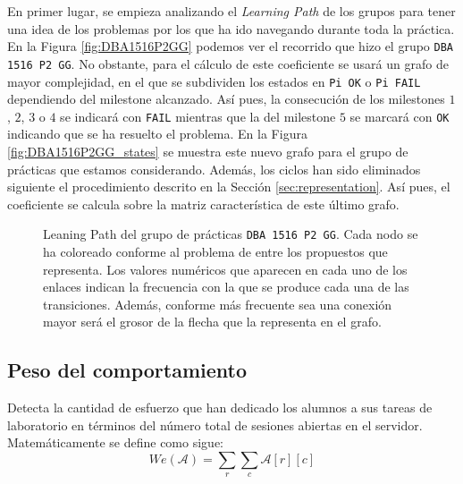 En primer lugar, se empieza analizando el \emph{Learning Path} de los grupos para tener una idea de los problemas por los que ha ido navegando durante toda la práctica. En la Figura \ref{fig:DBA1516P2GG} podemos ver el recorrido que hizo el grupo \texttt{DBA 1516 P2 GG}. No obstante, para el cálculo de este coeficiente se usará un grafo de mayor complejidad, en el que se subdividen los estados en \texttt{Pi OK} o \texttt{Pi FAIL} dependiendo del milestone alcanzado. Así pues, la consecución de los milestones $1$, $2$, $3$ o $4$ se indicará con \texttt{FAIL} mientras que la del milestone $5$ se marcará con \texttt{OK} indicando que se ha resuelto el problema. En la Figura \ref{fig:DBA1516P2GG_states} se muestra este nuevo grafo para el grupo de prácticas que estamos considerando. Además, los ciclos han sido eliminados siguiente el procedimiento descrito en la Sección \ref{sec:representation}. Así pues, el coeficiente se calcula sobre la matriz característica de este último grafo.

\begin{figure}[H]
\centering
{}\qquad
{}
\caption{Leaning Path del grupo de prácticas \texttt{DBA 1516 P2 GG}. Cada nodo se ha coloreado conforme al problema de entre los propuestos que representa. Los valores numéricos que aparecen en cada uno de los enlaces indican la frecuencia con la que se produce cada una de las transiciones. Además, conforme más frecuente sea una conexión mayor será el grosor de la flecha que la representa en el grafo.}
\label{fig:laplacian}
\end{figure}

\subsection{Peso del comportamiento}
Detecta la cantidad de esfuerzo que han dedicado los alumnos a sus tareas de laboratorio en términos del número total de sesiones abiertas en el servidor. Matemáticamente se define como sigue:
\begin{equation}
We(\mathcal{A}) = \sum_r \sum_c \mathcal{A}[r][c]
\end{equation}
